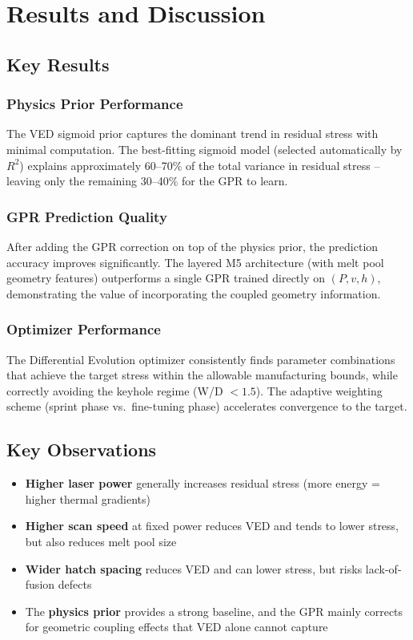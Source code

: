 \documentclass[12pt,a4paper]{report}
\begin{document}
\chapter{Results and Discussion}

\section{Key Results}

\subsection{Physics Prior Performance}
The VED sigmoid prior captures the dominant trend in residual stress with minimal computation. The best-fitting sigmoid model (selected automatically by $R^2$) explains approximately 60--70\% of the total variance in residual stress -- leaving only the remaining 30--40\% for the GPR to learn.

\subsection{GPR Prediction Quality}
After adding the GPR correction on top of the physics prior, the prediction accuracy improves significantly. The layered M5 architecture (with melt pool geometry features) outperforms a single GPR trained directly on $(P, v, h)$, demonstrating the value of incorporating the coupled geometry information.

\subsection{Optimizer Performance}
The Differential Evolution optimizer consistently finds parameter combinations that achieve the target stress within the allowable manufacturing bounds, while correctly avoiding the keyhole regime (W/D $< 1.5$). The adaptive weighting scheme (sprint phase vs.\ fine-tuning phase) accelerates convergence to the target.

\section{Key Observations}

\begin{itemize}
  \item \textbf{Higher laser power} generally increases residual stress (more energy = higher thermal gradients)
  \item \textbf{Higher scan speed} at fixed power reduces VED and tends to lower stress, but also reduces melt pool size
  \item \textbf{Wider hatch spacing} reduces VED and can lower stress, but risks lack-of-fusion defects
  \item The \textbf{physics prior} provides a strong baseline, and the GPR mainly corrects for geometric coupling effects that VED alone cannot capture
\end{itemize}
\end{document}
